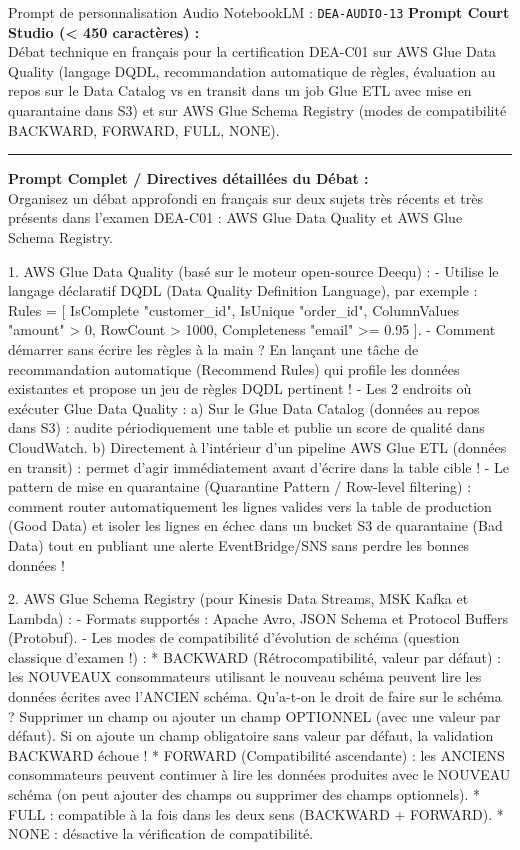 \documentclass[11pt,a4paper]{article}
\begin{document}
\begin{promptbox}{Prompt de personnalisation Audio NotebookLM : \texttt{DEA-AUDIO-13}}
\textbf{Prompt Court Studio (< 450 caractères) :}\\
Débat technique en français pour la certification DEA-C01 sur AWS Glue Data Quality (langage DQDL, recommandation automatique de règles, évaluation au repos sur le Data Catalog vs en transit dans un job Glue ETL avec mise en quarantaine dans S3) et sur AWS Glue Schema Registry (modes de compatibilité BACKWARD, FORWARD, FULL, NONE).

\medskip\hrule\medskip
\textbf{Prompt Complet / Directives détaillées du Débat :}\\
Organisez un débat approfondi en français sur deux sujets très récents et très présents dans l'examen DEA-C01 : AWS Glue Data Quality et AWS Glue Schema Registry.

1. AWS Glue Data Quality (basé sur le moteur open-source Deequ) :
- Utilise le langage déclaratif DQDL (Data Quality Definition Language), par exemple : Rules = [ IsComplete "customer\_id", IsUnique "order\_id", ColumnValues "amount" > 0, RowCount > 1000, Completeness "email" >= 0.95 ].
- Comment démarrer sans écrire les règles à la main ? En lançant une tâche de recommandation automatique (Recommend Rules) qui profile les données existantes et propose un jeu de règles DQDL pertinent !
- Les 2 endroits où exécuter Glue Data Quality :
  a) Sur le Glue Data Catalog (données au repos dans S3) : audite périodiquement une table et publie un score de qualité dans CloudWatch.
  b) Directement à l'intérieur d'un pipeline AWS Glue ETL (données en transit) : permet d'agir immédiatement avant d'écrire dans la table cible !
- Le pattern de mise en quarantaine (Quarantine Pattern / Row-level filtering) : comment router automatiquement les lignes valides vers la table de production (Good Data) et isoler les lignes en échec dans un bucket S3 de quarantaine (Bad Data) tout en publiant une alerte EventBridge/SNS sans perdre les bonnes données !

2. AWS Glue Schema Registry (pour Kinesis Data Streams, MSK Kafka et Lambda) :
- Formats supportés : Apache Avro, JSON Schema et Protocol Buffers (Protobuf).
- Les modes de compatibilité d'évolution de schéma (question classique d'examen !) :
  * BACKWARD (Rétrocompatibilité, valeur par défaut) : les NOUVEAUX consommateurs utilisant le nouveau schéma peuvent lire les données écrites avec l'ANCIEN schéma. Qu'a-t-on le droit de faire sur le schéma ? Supprimer un champ ou ajouter un champ OPTIONNEL (avec une valeur par défaut). Si on ajoute un champ obligatoire sans valeur par défaut, la validation BACKWARD échoue !
  * FORWARD (Compatibilité ascendante) : les ANCIENS consommateurs peuvent continuer à lire les données produites avec le NOUVEAU schéma (on peut ajouter des champs ou supprimer des champs optionnels).
  * FULL : compatible à la fois dans les deux sens (BACKWARD + FORWARD).
  * NONE : désactive la vérification de compatibilité.
\end{promptbox}
\end{document}
